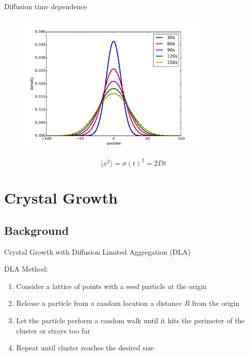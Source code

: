 \documentclass{beamer}
\begin{document}
\begin{frame}{Diffusion time dependence}

\begin{figure}[H]
	\centering
	\includegraphics[width=0.8\textwidth]{diffusion.pdf}
\end{figure}
\begin{equation}
\langle x^2\rangle=\sigma(t)^2=2Dt
\end{equation}

\end{frame}


\section{Crystal Growth}


\subsection{Background}

\begin{frame}{Crystal Growth with Diffusion Limited Aggregation (DLA)}

DLA Method:

\begin{enumerate}

\item Consider a lattice of points with a seed particle at the origin

\item Release a particle from a random location a distance $R$ from the origin

\item Let the particle perform a random walk until it hits the perimeter of the cluster or strays too far

\item Repeat until cluster reaches the desired size
\end{enumerate}

\end{frame}
\end{document}
